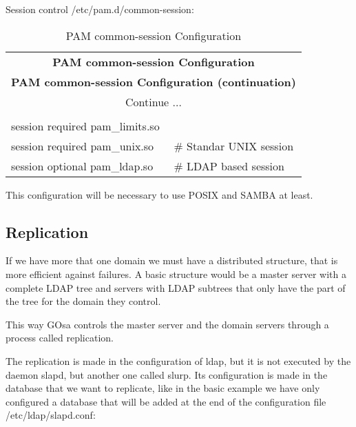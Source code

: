 Session control /etc/pam.d/common-session:
\begin{center}
\begin{longtable}{|ll|}\hline
\caption{PAM common-session Configuration}\\
\hline \hline
\multicolumn{2}{|c|}{\textbf{PAM common-session Configuration}}\\
\hline \hline
\endfirsthead
\hline \hline
\multicolumn{2}{|c|}{\textbf{PAM common-session Configuration (continuation)}}\\
\hline \hline
\endhead
\hline
\multicolumn{2}{|c|}{Continue $\ldots$}\\
\hline
\endfoot
\hline
\multicolumn{2}{|c|}{\textbf{End}}\\
\hline
\endlastfoot
session required        pam\_limits.so & \\
session required        pam\_unix.so & \# Standar UNIX session\\
session optional        pam\_ldap.so & \# LDAP based session\\
\end{longtable}
\end{center}

This configuration will be necessary to use POSIX and SAMBA at least.
\newpage
\subsection{Replication}

If we have more that one domain we must have a distributed structure, that is more efficient against failures. A basic structure would be a master server with a complete LDAP tree and servers with LDAP subtrees that only have the part of the tree for the domain they control.

This way GOsa controls the master server and the domain servers through a process called replication.

The replication is made in the configuration of ldap, but it is not executed by the daemon slapd, but another one called slurp. Its configuration is made in the database that we want to replicate, like in the basic example we have only configured a database that will be added at the end of the configuration file /etc/ldap/slapd.conf: 

